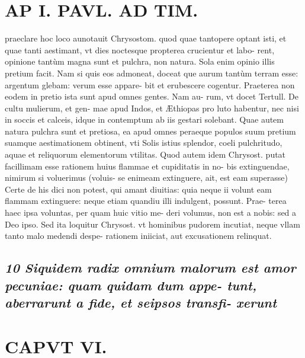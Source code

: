 \documentclass{article}
\begin{document}
\begin{pages}
\section*{AP I. PAVL. AD TIM. }
\marginpar{[ p.452 ]}\pstart praeclare hoc loco aunotauit Chrysostom. quod quae tantopere optant isti, et quae tanti aestimant, vt dies noctesque propterea crucientur et labo- rent, opinione tantùm magna sunt et pulchra, non natura. Sola enim opinio illis pretium facit. Nam si quis eos admoneat, doceat que aurum tantùm terram esse: argentum glebam: verum esse appare- bit et erubescere cogentur. Praeterea non eodem in pretio ista sunt apud omnes gentes. Nam au- rum, vt docet Tertull. De cultu mulierum, et gen- mae apud Indos, et Æthiopas pro luto habentur, nec nisi in soccis et calceis, idque in contemptum ab iis gestari solebant. Quae autem natura pulchra sunt et pretiosa, ea apud omnes peraeque populos suum pretium suamque aestimationem obtinent, vti Solis istius splendor, coeli pulchritudo, aquae et reliquorum elementorum vtilitas.  \pend\pstart Quod autem idem Chrysost. putat facillimam esse rationem huius flammae et cupiditatis in no- bis extinguendae, nimirum si voluerimus (voluis- se enimeam extinguere, ait, est eam superasse) Certe de his dici non potest, qui amant diuitias: quia neque ii volunt eam flammam extinguere: neque etiam quandiu illi indulgent, possunt. Prae- terea haec ipsa voluntas, per quam huic vitio me- deri volumus, non est a nobis: sed a Deo ipso. Sed ita loquitur Chrysost. vt hominibus pudorem incutiat, neque vllam tanto malo medendi despe- rationem iniiciat, aut excusationem relinquat.  \pend
{}
{}
\subsection*{\textit{10 Siquidem radix omnium malorum est amor pecuniae: quam quidam dum appe- tunt, aberrarunt a fide, et seipsos transfi- xerunt }}
\section*{CAPVT  VI. }
\marginpar{[ p.453 ]}
{}

\end{pages}
\end{document}
